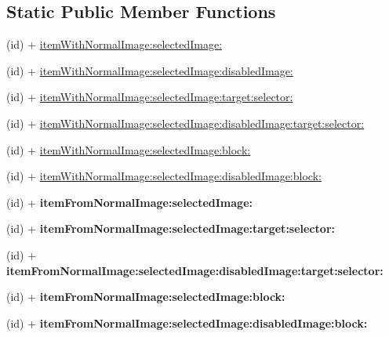 \subsection*{Static Public Member Functions}
\begin{DoxyCompactItemize}
\item 
(id) + \hyperlink{class_c_c_menu_item_image_ad31781f1d12d4bfaa388f1f1fd47656e}{item\-With\-Normal\-Image\-:selected\-Image\-:}
\item 
(id) + \hyperlink{class_c_c_menu_item_image_aac71292ea19de56516759cda14fc9e1d}{item\-With\-Normal\-Image\-:selected\-Image\-:disabled\-Image\-:}
\item 
(id) + \hyperlink{class_c_c_menu_item_image_a9504d5d6658b2e656e4a737aa421b97c}{item\-With\-Normal\-Image\-:selected\-Image\-:target\-:selector\-:}
\item 
(id) + \hyperlink{class_c_c_menu_item_image_a9d1cd4590c29e6e43083da9c4257b7e2}{item\-With\-Normal\-Image\-:selected\-Image\-:disabled\-Image\-:target\-:selector\-:}
\item 
(id) + \hyperlink{class_c_c_menu_item_image_a965c28d30da7e68b8501c9c9f389ecdf}{item\-With\-Normal\-Image\-:selected\-Image\-:block\-:}
\item 
(id) + \hyperlink{class_c_c_menu_item_image_a7f34948957c6b59e44310c3c253f61a2}{item\-With\-Normal\-Image\-:selected\-Image\-:disabled\-Image\-:block\-:}
\item 
\hypertarget{class_c_c_menu_item_image_a976b2cb41eab3d5dceda79091d69780f}{(id) + {\bfseries item\-From\-Normal\-Image\-:selected\-Image\-:}}\label{class_c_c_menu_item_image_a976b2cb41eab3d5dceda79091d69780f}

\item 
\hypertarget{class_c_c_menu_item_image_a16ece83f716c3bc384c6a2d92878fd08}{(id) + {\bfseries item\-From\-Normal\-Image\-:selected\-Image\-:target\-:selector\-:}}\label{class_c_c_menu_item_image_a16ece83f716c3bc384c6a2d92878fd08}

\item 
\hypertarget{class_c_c_menu_item_image_a3b54e62973b03a1fbf1cdbebbefeb4ba}{(id) + {\bfseries item\-From\-Normal\-Image\-:selected\-Image\-:disabled\-Image\-:target\-:selector\-:}}\label{class_c_c_menu_item_image_a3b54e62973b03a1fbf1cdbebbefeb4ba}

\item 
\hypertarget{class_c_c_menu_item_image_ac1fbbb9f1fec96684ecd655d35b011de}{(id) + {\bfseries item\-From\-Normal\-Image\-:selected\-Image\-:block\-:}}\label{class_c_c_menu_item_image_ac1fbbb9f1fec96684ecd655d35b011de}

\item 
\hypertarget{class_c_c_menu_item_image_a47d830f9edef30fb429831505c45fd95}{(id) + {\bfseries item\-From\-Normal\-Image\-:selected\-Image\-:disabled\-Image\-:block\-:}}\label{class_c_c_menu_item_image_a47d830f9edef30fb429831505c45fd95}

\end{DoxyCompactItemize}


